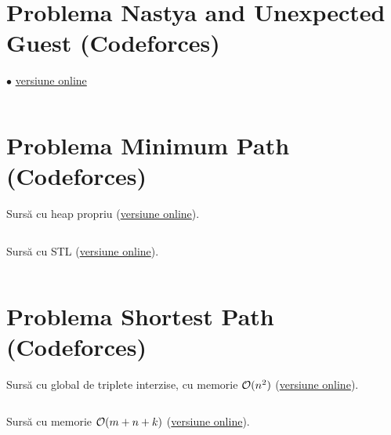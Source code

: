 \documentclass[../main.tex]{subfiles}
\begin{document}
\inputminted{cpp}{../src/graphs/president-and-roads.cpp}

\section{Problema Nastya and Unexpected Guest (Codeforces)}
\label{code:nastya-and-unexpected-guest}
$\bullet$
\href{https://codeforces.com/contest/1341/submission/243943322}{versiune online}

\inputminted{cpp}{../src/graphs/nastya-and-unexpected-guest.cpp}

\section{Problema Minimum Path (Codeforces)}
\label{code:minimum-path}

Sursă cu heap propriu (\href{https://codeforces.com/contest/1473/submission/363749733}{versiune online}).

\inputminted{cpp}{../src/graphs/minimum-path.cpp}

Sursă cu STL (\href{https://codeforces.com/contest/1473/submission/363749796}{versiune online}).

\inputminted{cpp}{../src/graphs/minimum-path-stl.cpp}

\section{Problema Shortest Path (Codeforces)}
\label{code:shortest-path}

Sursă cu  global de triplete interzise, cu memorie $\mathcal{O}(n^2)$ (\href{https://codeforces.com/contest/59/submission/309345336}{versiune online}).

\inputminted{cpp}{../src/graphs/shortest-path-1.cpp}

Sursă cu memorie $\mathcal{O}(m + n + k)$ (\href{https://codeforces.com/contest/59/submission/309493297}{versiune online}).

\inputminted{cpp}{../src/graphs/shortest-path-2.cpp}
\end{document}
